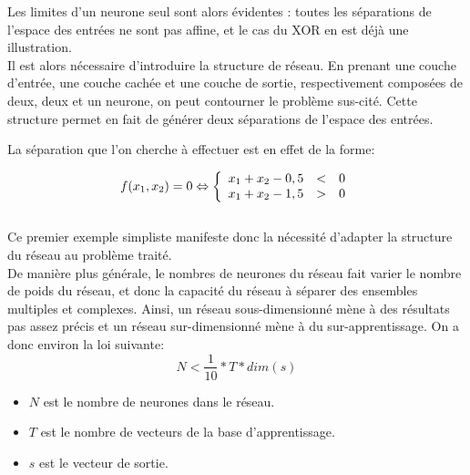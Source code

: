 \documentclass[a4paper,oneside]{report}
\begin{document}
                Les limites d'un neurone seul sont alors évidentes : toutes les séparations de l'espace des entrées ne sont pas affine, et le cas du XOR en est déjà  une illustration.\\

                Il est alors nécessaire d'introduire la structure de réseau. En prenant une couche d'entrée, une couche cachée et une couche de sortie, respectivement composées de deux, deux et un neurone, on peut contourner le problème sus-cité. Cette structure permet en fait de générer deux séparations de l'espace des entrées.

                La séparation que l'on cherche à  effectuer est en effet de la forme:

                \begin{equation}
                    f(x_{1},x_{2})=0 \Leftrightarrow
                    \left\{
                        \begin{array}{r c l}
                        x_{1}+x_{2}-0,5 &<& 0\\
                        x_{1}+x_{2}-1,5 &>& 0
                        \end{array}
                    \right.
                \end{equation}\\

                Ce premier exemple simpliste manifeste donc la nécessité d'adapter la structure du réseau au problème traité.\\

                De manière plus générale, le nombres de neurones du réseau fait varier le nombre de poids du réseau, et donc la capacité du réseau à  séparer des ensembles multiples et complexes. Ainsi, un réseau sous-dimensionné mène à  des résultats pas assez précis et un réseau sur-dimensionné mène à  du sur-apprentissage. On a donc environ la loi suivante:
                \begin{equation}
                    N<\frac{1}{10}*T*dim(s)
                \end{equation}
                \begin{itemize}
                    \item $N$ est le nombre de neurones dans le réseau.
                    \item $T$ est le nombre de vecteurs de la base d'apprentissage.
                    \item $s$ est le vecteur de sortie.
                \end{itemize}
\end{document}
